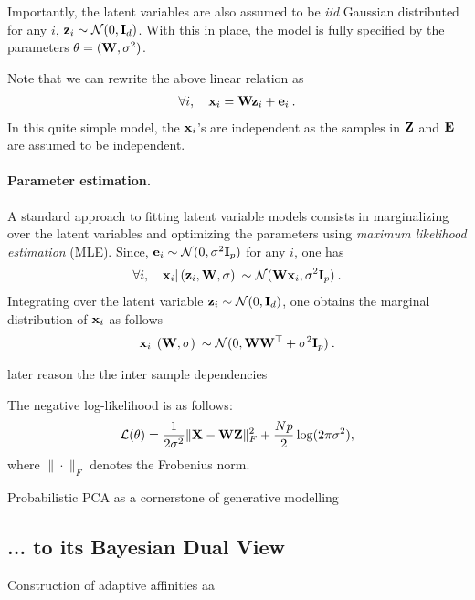 Importantly, the latent variables are also assumed to be \emph{iid} Gaussian distributed \ie for any $i$, ${\mathbf{z}}_i \sim \mathcal{N}(0, {\mathbf{I}}_d)$. With this in place, the model is fully specified by the parameters $\theta = ({\mathbf{W}}, \sigma^2)$.

Note that we can rewrite the above linear relation as
\begin{align}
    \forall i, \quad {\mathbf{x}}_i = {\mathbf{W}} {\mathbf{z}}_i + {\mathbf{e}}_i \:.
\end{align}
In this quite simple model, the ${\mathbf{x}}_i$'s are independent as the samples in ${\mathbf{Z}}$ and ${\mathbf{E}}$ are assumed to be independent.

\paragraph{Parameter estimation.} A standard approach to fitting latent variable models consists in marginalizing over the latent variables and optimizing the parameters using \emph{maximum likelihood estimation} (MLE).
Since, ${\mathbf{e}}_i \sim \mathcal{N}(0, \sigma^2 {\mathbf{I}}_p)$ for any $i$, one has 
\begin{align}
    \forall i, \quad {\mathbf{x}}_i | \left( {\mathbf{z}}_i, {\mathbf{W}}, \sigma \right) \: \sim \mathcal{N}({\mathbf{W}} {\mathbf{x}}_i, \sigma^2 {\mathbf{I}}_p) \:.
\end{align}
Integrating over the latent variable ${\mathbf{z}}_i \sim \mathcal{N}(0, {\mathbf{I}}_d)$, one obtains the marginal distribution of ${\mathbf{x}}_i$ as follows
\begin{align}
    {\mathbf{x}}_i | \left( {\mathbf{W}}, \sigma \right) \: \sim \mathcal{N}(0, {\mathbf{W}} {\mathbf{W}}^\top + \sigma^2 {\mathbf{I}}_p) \:.
\end{align}

\begin{remark}
    later reason the the inter sample dependencies
\end{remark}

The negative log-likelihood is as follows:
\begin{align}
    \mathcal{L}(\theta) = \frac{1}{2\sigma^2} \| {\mathbf{X}} - {\mathbf{W}} {\mathbf{Z}} \|_F^2 + \frac{Np}{2} \log(2\pi\sigma^2),
\end{align}
where $\| \cdot \|_F$ denotes the Frobenius norm.

\begin{remark}
    Probabilistic PCA as a cornerstone of generative modelling    

    \citep{tomczak2021latent}
\end{remark}

\subsection{... to its Bayesian Dual View}


\citep{lawrence2005probabilistic}


\begin{prob}{Construction of adaptive affinities}
    aa
\end{prob}